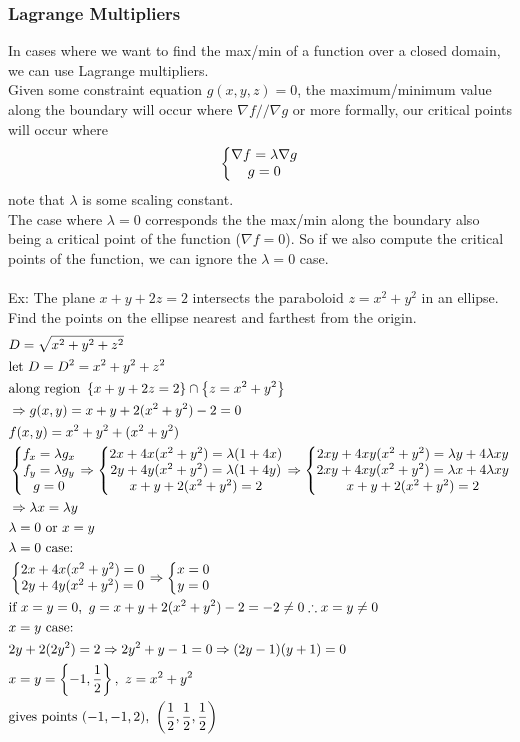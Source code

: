 \documentclass[11pt, fleqn]{article}
\begin{document}
\subsubsection{Lagrange Multipliers}
In cases where we want to find the max/min of a function over a closed domain, we can use Lagrange multipliers.\\
Given some constraint equation $g(x,y,z)=0$, the maximum/minimum value along the boundary will occur where $\nabla f//\nabla g$ or more formally, our critical points will occur where
$$\left\{\begin{matrix} \nabla f=\lambda\nabla g\\g=0 \end{matrix}\right.$$
note that $\lambda$ is some scaling constant.\\
The case where $\lambda=0$ corresponds the the max/min along the boundary also being a critical point of the function ($\nabla f=0$). So if we also compute the critical points of the function, we can ignore the $\lambda=0$ case.\\
\\
Ex: The plane $x+y+2z=2$ intersects the paraboloid $z=x^2+y^2$ in an ellipse. Find the points on the ellipse nearest and farthest from the origin.
\begin{align*}
    &D=\sqrt{x^2+y^2+z^2}\\
    &\text{let }D=D^2=x^2+y^2+z^2\\
    &\text{along region }\brcurly{x+y+2z=2}\cap\brcurly{z=x^2+y^2}\\
    &\Ra g(x,y)=x+y+2(x^2+y^2)-2=0\\
    &f(x,y)=x^2+y^2+(x^2+y^2)\\
    &\eqnsystem{f_x=\lambda g_x\\f_y=\lambda g_y\\g=0}\Ra \eqnsystem{2x+4x(x^2+y^2)=\lambda(1+4x)\\2y+4y(x^2+y^2)=\lambda(1+4y)\\x+y+2(x^2+y^2)=2}\Ra\eqnsystem{2xy+4xy(x^2+y^2)=\lambda y+4\lambda xy\\2xy+4xy(x^2+y^2)=\lambda x+4\lambda xy\\x+y+2(x^2+y^2)=2}\\
    &\Ra \lambda x=\lambda y\\
    &\lambda =0\text{ or }x=y\\
    &\lambda=0\text{ case:}\\
    &\eqnsystem{2x+4x(x^2+y^2)=0\\2y+4y(x^2+y^2)=0}\Ra\eqnsystem{x=0\\y=0}\\
    &\text{if }x=y=0,\ g=x+y+2(x^2+y^2)-2=-2\neq 0\therefore x=y\neq 0\\
    &x=y\text{ case:}\\
    &2y+2(2y^2)=2\Ra 2y^2+y-1=0\Ra(2y-1)(y+1)=0\\
    &x=y=\brcurly{-1,\frac{1}{2}},\ z=x^2+y^2\\
    &\text{gives points }(-1,-1,2),\ \brround{\frac{1}{2},\frac{1}{2},\frac{1}{2}}
\end{align*}
\end{document}
